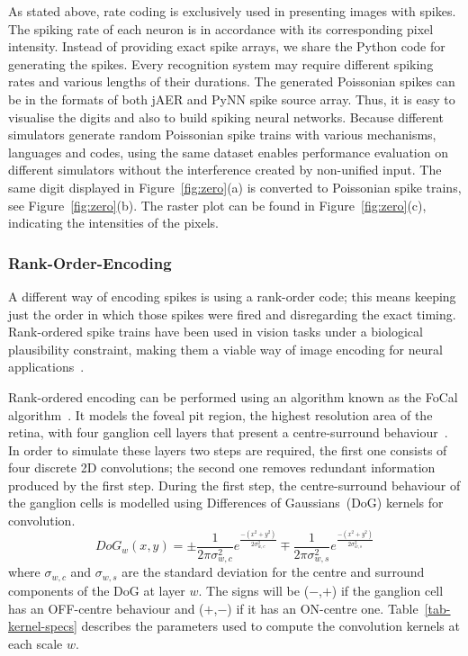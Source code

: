 \documentclass{frontiersENG} %
\begin{document}
As stated above, rate coding is exclusively used in presenting images with spikes.
The spiking rate of each neuron is in accordance with its corresponding pixel intensity.
Instead of providing exact spike arrays, we share the Python code for generating the spikes.
Every recognition system may require different spiking rates and various lengths of their durations.
The generated Poissonian spikes can be in the formats of both jAER and PyNN spike source array.
Thus, it is easy to visualise the digits and also to build spiking neural networks.
Because different simulators generate random Poissonian spike trains with various mechanisms, languages and codes, using the same dataset enables performance evaluation on different simulators without the interference created by non-unified input.
The same digit displayed in Figure~\ref{fig:zero}(a) is converted to Poissonian spike trains, see Figure~\ref{fig:zero}(b).
The raster plot can be found in Figure~\ref{fig:zero}(c), indicating the intensities of the pixels.



\subsubsection{Rank-Order-Encoding}
A different way of encoding spikes is using a rank-order code; this means
keeping just the order in which those spikes were fired and disregarding the exact timing. Rank-ordered spike trains have been used in vision tasks under a biological plausibility constraint, making them a viable way of image encoding for neural applications~\citep{van2001rate,sen2009evaluating,masmoudi2010novel}.

Rank-ordered encoding can be performed using an algorithm known as the
{FoCal algorithm~\citep{sen2009evaluating}}.
It models the foveal pit region, the highest resolution area of the retina, with four ganglion cell layers that present a centre-surround behaviour~\citep{kolb2003retina}. In order to simulate these layers two steps are required, the first one consists of four discrete 2D convolutions; the second one removes redundant information produced by the first step. During the first step, the centre-surround behaviour of the ganglion cells is modelled using Differences of Gaussians~(DoG) kernels for convolution. 
\begin{equation}
\label{eq-dog}
DoG_w(x,y) = \pm\frac{1}{2\pi\sigma_{w,c}^2}e^{\frac{-(x^2 + y^2)}{2\sigma_{w,c}^2}}
\mp\frac{1}{2\pi\sigma_{w,s}^2}e^{\frac{-(x^2 + y^2)}{2\sigma_{w,s}^2}}
\end{equation}
where $\sigma_{w,c}$ and $\sigma_{w,s}$ are the standard deviation for the 
centre and surround components of the DoG at layer $w$. The signs 
will be ($-$,$+$) if the ganglion cell has an OFF-centre behaviour and 
($+$,$-$) if it has an ON-centre one. Table~\ref{tab-kernel-specs} 
describes the parameters used to compute the convolution kernels at each 
scale $w$.
\end{document}
